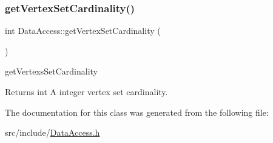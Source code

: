 \subsubsection{\texorpdfstring{get\+Vertex\+Set\+Cardinality()}{getVertexSetCardinality()}}
{\footnotesize\ttfamily int Data\+Access\+::get\+Vertex\+Set\+Cardinality (\begin{DoxyParamCaption}{ }\end{DoxyParamCaption})}



get\+Vertexs\+Set\+Cardinality 

\begin{DoxyReturn}{Returns}
int A integer vertex set cardinality. 
\end{DoxyReturn}


The documentation for this class was generated from the following file\+:\begin{DoxyCompactItemize}
\item 
src/include/\hyperlink{DataAccess_8h}{Data\+Access.\+h}\end{DoxyCompactItemize}
